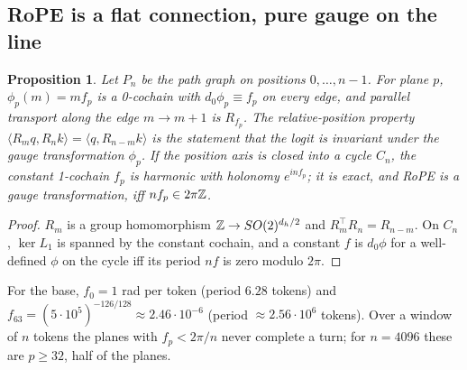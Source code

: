 \documentclass[10pt]{article}
\newtheorem{prop}[thm]{Proposition}
\theoremstyle{definition}
\begin{document}
\subsection{RoPE is a flat connection, pure gauge on the line}
\begin{prop}\label{p:ropegauge}
Let $P_n$ be the path graph on positions $0,\dots,n-1$. For plane $p$, $\phi_p(m)=mf_p$ is a 0-cochain with $d_0\phi_p\equiv f_p$ on every edge, and parallel transport along the edge $m\to m+1$ is $R_{f_p}$. The relative-position property $\langle R_mq,R_nk\rangle=\langle q,R_{n-m}k\rangle$ is the statement that the logit is invariant under the gauge transformation $\phi_p$. If the position axis is closed into a cycle $C_n$, the constant 1-cochain $f_p$ is harmonic with holonomy $e^{inf_p}$; it is exact, and RoPE is a gauge transformation, iff $nf_p\in2\pi\mathbb Z$.
\end{prop}
\begin{proof}
$R_m$ is a group homomorphism $\mathbb Z\to SO(2)^{d_h/2}$ and $R_m^{\top}R_n=R_{n-m}$. On $C_n$, $\ker L_1$ is spanned by the constant cochain, and a constant $f$ is $d_0\phi$ for a well-defined $\phi$ on the cycle iff its period $nf$ is zero modulo $2\pi$.
\end{proof}
\noindent For the base, $f_0=1$ rad per token (period $6.28$ tokens) and $f_{63}=(5\cdot10^5)^{-126/128}\approx2.46\cdot10^{-6}$ (period $\approx2.56\cdot10^6$ tokens). Over a window of $n$ tokens the planes with $f_p<2\pi/n$ never complete a turn; for $n=4096$ these are $p\ge32$, half of the planes.
\end{document}
